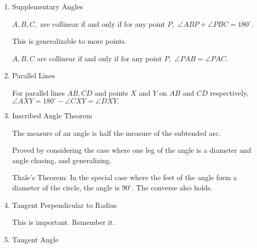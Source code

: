 \begin{enumerate}
    \item Supplementary Angles
    
    \begin{itemize}
    
    \Item $A,B,C,$ are collinear if and only if for any point $P,$ $\angle ABP+\angle PBC=180^{\circ}.$
    
    \Item This is generalizable to more points.
    
    \Item $A,B,C$ are collinear if and only if for any point $P,$ $\angle PAB=\angle PAC.$
    
    \end{itemize}
 
    \item Parallel Lines
    
    \begin{itemize}
    
    \Item For parallel lines $AB,CD$ and points $X$ and $Y$ on $AB$ and $CD$ respectively, $\angle AXY=180^{\circ}-\angle CXY=\angle DXY.$
    
    \end{itemize}
    
    \item Inscribed Angle Theorem
    
    \begin{itemize}
    
    \Item The measure of an angle is half the measure of the subtended arc.
    
    \Item Proved by considering the case where one leg of the angle is a diameter and angle chasing, and generalizing.
    
    \Item Thale's Theorem: In the special case where the feet of the angle form a diameter of the circle, the angle is $90^{\circ}.$ The converse also holds.
    
    \end{itemize}
    
    \item Tangent Perpendicular to Radius
    
    \begin{itemize}
    
    \Item This is important. Remember it.
    
    \end{itemize}
    
    \item Tangent Angle
    

\end{enumerate}

